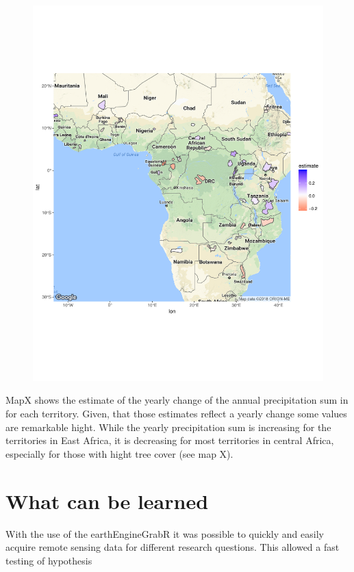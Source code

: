 \begin{center}
	\begin{figure}[h]
		\begin{center}
			\includegraphics[width=15cm]{images/sample_session_3_change_map.pdf}
		\end{center}
	\end{figure}
\end{center}


MapX shows the estimate of the yearly change of the annual precipitation sum in for each territory. Given, that those estimates reflect a yearly change some values are remarkable hight. While the yearly precipitation sum is increasing for the territories in East Africa, it is decreasing for most territories in central Africa, especially for those with hight tree cover (see map X).

\section{What can be learned}


With the use of the earthEngineGrabR it was possible to quickly and easily acquire remote sensing data for different research questions. This allowed a fast testing of hypothesis





